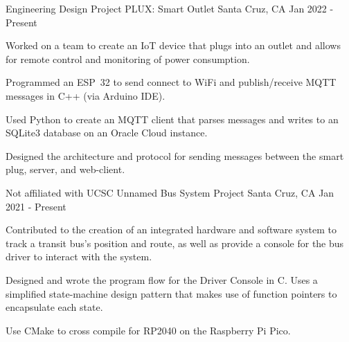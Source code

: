 \begin{cventries}
  \cventry
    {Engineering Design Project} %
    {PLUX: Smart Outlet} %
    {Santa Cruz, CA} %
    {Jan 2022 - Present} %
    {
      \begin{cvitems} %
        \item {Worked on a team to create an IoT device that plugs into an outlet and allows for remote control and monitoring of power consumption.}
        \item {Programmed an ESP~32 to send connect to WiFi and publish/receive MQTT messages in C++ (via Arduino IDE).}
        \item {Used Python to create an MQTT client that parses messages and writes to an SQLite3 database on an Oracle Cloud instance.}
        \item {Designed the architecture and protocol for sending messages between the smart plug, server, and web-client.}
      \end{cvitems}
    }

  \cventry
    {Not affiliated with UCSC} %
    {Unnamed Bus System Project} %
    {Santa Cruz, CA} %
    {Jan 2021 - Present} %
    {
      \begin{cvitems} %
      	\item {Contributed to the creation of an integrated hardware and software system to track a transit bus's position and  route, as well as provide a console for the bus driver to interact with the system.}
      	\item {Designed and wrote the program flow for the Driver Console in C. Uses a simplified state-machine design pattern that makes use of function pointers to encapsulate each state.}
      	\item {Use CMake to cross compile for RP2040 on the Raspberry Pi Pico.}
      \end{cvitems}
    }
    

\end{cventries}
